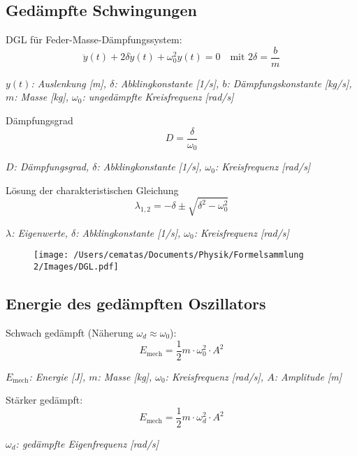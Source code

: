 \documentclass[a4paper,10pt]{article}
\newenvironment{displayformula}
{
	\begin{framed}
		\color{formulaColor}
	}
	{\end{framed}}
\newcommand{\formulalegend}[1]{%
	\par\vspace{0.5ex}%
	{{\color{legendColor}\RaggedRight\small\textit{#1}}}%
	\par\vspace{1.5ex}%
}
\begin{document}
\subsection{Gedämpfte Schwingungen}

\begin{displayformula}
	DGL für Feder-Masse-Dämpfungssystem:
	\[
	\ddot{y}(t) + 2\delta \dot{y}(t) + \omega_0^2 y(t) = 0
	\quad \text{mit } 2\delta = \frac{b}{m}
	\]
\end{displayformula}
\formulalegend{
	\( y(t) \): Auslenkung [m], \( \delta \): Abklingkonstante [1/s], \( b \): Dämpfungskonstante [kg/s], \( m \): Masse [kg], \( \omega_0 \): ungedämpfte Kreisfrequenz [rad/s]
}

\begin{displayformula}
	Dämpfungsgrad
	\[
	D = \frac{\delta}{\omega_0}
	\]
\end{displayformula}
\formulalegend{
	\( D \): Dämpfungsgrad, \( \delta \): Abklingkonstante [1/s], \( \omega_0 \): Kreisfrequenz [rad/s]
}

\begin{displayformula}
	Lösung der charakteristischen Gleichung
	\[
	\lambda_{1,2} = -\delta \pm \sqrt{\delta^2 - \omega_0^2}
	\]
\end{displayformula}
\formulalegend{
	\( \lambda \): Eigenwerte, \( \delta \): Abklingkonstante [1/s], \( \omega_0 \): Kreisfrequenz [rad/s]
}

\begin{figure}[h!]
	\centering
	\texttt{[image: /Users/cematas/Documents/Physik/Formelsammlung 2/Images/DGL.pdf]}
\end{figure}

\subsection{Energie des gedämpften Oszillators}

\begin{displayformula}
	Schwach gedämpft (Näherung \( \omega_d \approx \omega_0 \)):
	\[
	E_{\text{mech}} = \frac{1}{2} m \cdot \omega_0^2 \cdot A^2
	\]
\end{displayformula}
\formulalegend{
	\( E_{\text{mech}} \): Energie [J], \( m \): Masse [kg], \( \omega_0 \): Kreisfrequenz [rad/s], \( A \): Amplitude [m]
}

\begin{displayformula}
	Stärker gedämpft:
	\[
	E_{\text{mech}} = \frac{1}{2} m \cdot \omega_d^2 \cdot A^2
	\]
\end{displayformula}
\formulalegend{
	\( \omega_d \): gedämpfte Eigenfrequenz [rad/s]
}
\end{document}
